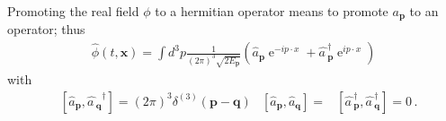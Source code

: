 \begin{frame}
Promoting the real field
$\phi$ to a hermitian operator means to promote $a_\mathbf{p}$ to an operator; thus
\begin{align}
  \label{eq:31}
  \widehat{\phi}(t,\mathbf{x})=\int d^3p \frac{1}{(2\pi)^3\sqrt{2E_\mathbf{p} }}
  \left(\widehat{a}_\mathbf{p} \operatorname{e}^{-i p\cdot x }+\widehat{a\,}_\mathbf{p}^\dagger \operatorname{e}^{i p\cdot x }\right)
\end{align}
with
\begin{align}
\label{eq:32f}
  &\left[\widehat{a}_{\mathbf{p}},{\widehat{a\,}_{\mathbf{q}}}^{ \dagger}\right]=
\left(2\pi\right)^3\delta^{(3)}(\mathbf{p}-\mathbf{q})
&\left[\widehat{a}_{\mathbf{p}},\widehat{a}_{\mathbf{q}}\right]=&
\left[\widehat{a\,}_\mathbf{p}^{\dagger},\widehat{a\,}_\mathbf{q}^{\dagger}\right]=0\,.
\end{align}


\end{frame}
